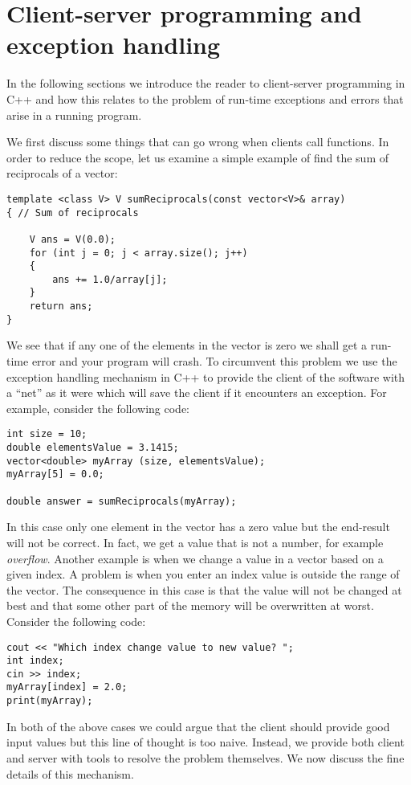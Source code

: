 \section{Client-server programming and exception handling}
In the following sections we introduce the reader to client-server programming in C++ and how this relates to the problem of run-time exceptions and errors that arise in a running program.

We first discuss some things that can go wrong when clients call functions. In order to reduce the scope, let us examine a simple example of find the sum of reciprocals of a vector:
\begin{lstlisting}
template <class V> V sumReciprocals(const vector<V>& array)
{ // Sum of reciprocals

	V ans = V(0.0);
	for (int j = 0; j < array.size(); j++)
	{
		ans += 1.0/array[j];
	}
	return ans;
}
\end{lstlisting}
We see that if any one of the elements in the vector is zero we shall get a run-time error and your program will crash. To circumvent this problem we use the exception handling mechanism in C++ to provide the client of the software with a ``net'' as it were which will save the client if it encounters an exception. For example, consider the following code:

\begin{lstlisting}
int size = 10;
double elementsValue = 3.1415;
vector<double> myArray (size, elementsValue);
myArray[5] = 0.0;

double answer = sumReciprocals(myArray);
\end{lstlisting}
In this case only one element in the vector has a zero value but the end-result will not be correct. In fact, we get a value that is not a number, for example \emph{overflow}.
Another example is when we change a value in a vector based on a given index. A problem is when you enter an index value is outside the range of the vector. The consequence in this case is that the value will not be changed at best and that some other part of the memory will be overwritten at worst. Consider the following code:
\begin{lstlisting}
cout << "Which index change value to new value? ";
int index;
cin >> index;
myArray[index] = 2.0;
print(myArray);
\end{lstlisting}
In both of the above cases we could argue that the client should provide good input values but this line of thought is too naive. Instead, we provide both client and server with tools to resolve the problem themselves. We now discuss the fine details of this mechanism.

